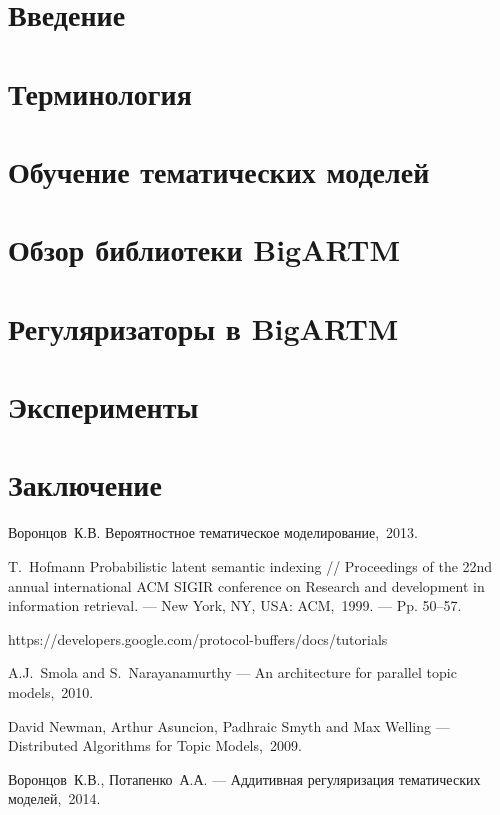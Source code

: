 \documentclass[12pt]{article}
\begin{document}
\tableofcontents
\newpage

\section{Введение}


\section{Терминология}


\section{Обучение тематических моделей}


\section{Обзор библиотеки BigARTM}


\section{Регуляризаторы в BigARTM}


\section{Эксперименты}


\section{Заключение}



\newpage
{}
\begin{thebibliography}{00}

Воронцов~К.В. Вероятностное тематическое моделирование,~2013.

T.~Hofmann Probabilistic latent semantic indexing // Proceedings of the 22nd annual international
ACM SIGIR conference on Research and development in information retrieval. — New York, NY,
USA: ACM,~1999. — Pp. 50–57.

https://developers.google.com/protocol-buffers/docs/tutorials

A.J.~Smola and S.~Narayanamurthy --- An architecture for parallel topic models,~2010.

David Newman, Arthur Asuncion, Padhraic Smyth and Max Welling --- Distributed Algorithms for Topic Models,~2009.

Воронцов~К.В., Потапенко~А.А. --- Аддитивная регуляризация тематических моделей,~2014.


\end{thebibliography}
\end{document}

